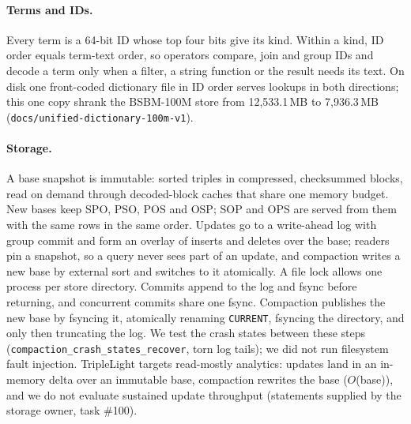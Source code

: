 \documentclass[sigconf, nonacm]{acmart}
\begin{document}
\paragraph{Terms and IDs.} Every term is a 64-bit ID whose top four bits give its kind. Within a kind, ID order equals term-text order, so operators compare, join and group
IDs and decode a term only when a filter, a string function or the result needs its text. On disk one front-coded dictionary file in ID order serves lookups in both directions;
this one copy shrank the BSBM-100M store from 12,533.1\,MB to 7,936.3\,MB (\texttt{docs/unified-dictionary-100m-v1}).

\paragraph{Storage.} A base snapshot is immutable: sorted triples in compressed, checksummed blocks, read on demand through decoded-block caches that share one memory budget.
New bases keep SPO, PSO, POS and OSP; SOP and OPS are served from them with the same rows in the same order. Updates go to a write-ahead log with group commit and form an
overlay of inserts and deletes over the base; readers pin a snapshot, so a query never sees part of an update, and compaction writes a new base by external sort and
switches to it atomically. A file lock allows one process per store directory.
Commits append to the log and fsync before returning, and concurrent commits share one fsync. Compaction publishes the new base by fsyncing it, atomically renaming \texttt{CURRENT}, fsyncing the directory, and only then truncating the log. We test the crash states between these steps (\texttt{compaction\_crash\_states\_recover}, torn log tails); we did not run filesystem fault injection. TripleLight targets read-mostly analytics: updates land in an in-memory delta over an immutable base, compaction rewrites the base ($O$(base)), and we do not evaluate sustained update throughput (statements supplied by the storage owner, task \#100).
\end{document}

